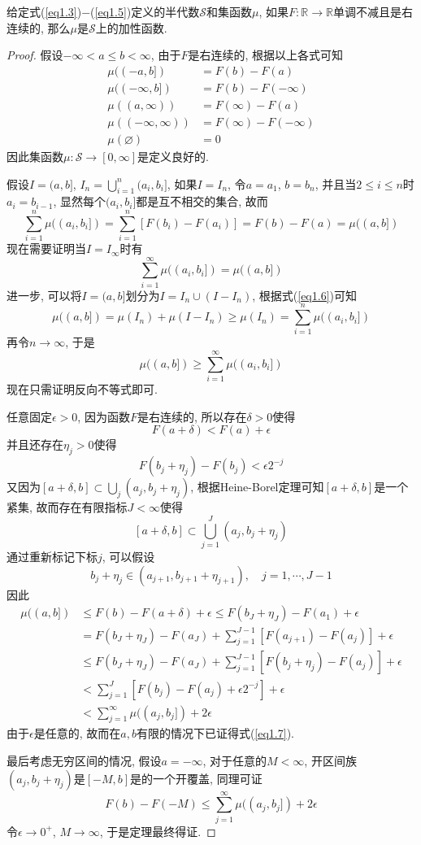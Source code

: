 \documentclass[cn, 12pt, math=mtpro2, bibstyle=apa, blue, twocol]{elegantbook}
\newcommand{\R}{\mathbb{R}}
\newcommand{\SE}{\mathcal{S}}
\let\emptyset\varnothing
\begin{document}
\begin{theorem}\label{thm:thm1.4}
  给定式(\ref{eq1.3})$-$(\ref{eq1.5})定义的半代数$\SE$和集函数$\mu$, 如果$F:\R\to\R$单调不减且是右连续的, 那么$\mu$是$\SE$上的加性函数.
\end{theorem}
\begin{proof}
  假设$-\infty<a\leq b<\infty$, 由于$F$是右连续的, 根据以上各式可知
  \begin{align*}
  \mu((-a,b])&=F(b)-F(a) \\
  \mu((-\infty,b])&=F(b)-F(-\infty) \\
  \mu((a,\infty))&=F(\infty)-F(a) \\
  \mu((-\infty,\infty))&=F(\infty)-F(-\infty) \\
  \mu(\emptyset)&=0
  \end{align*}
  因此集函数$\mu:\SE\to[0,\infty]$是定义良好的.

  假设$I=(a,b]$, $I_n=\bigcup_{i=1}^n(a_i,b_i]$, 如果$I=I_n$, 令$a=a_1$, $b=b_n$, 并且当$2\leq i\leq n$时$a_i=b_{i-1}$, 显然每个$(a_i,b_i]$都是互不相交的集合, 故而
  \begin{equation}\label{eq1.6}
    \sum_{i=1}^{n}\mu((a_i,b_i])=\sum_{i=1}^{n}[F(b_i)-F(a_i)]=F(b)-F(a)=\mu((a,b])
  \end{equation}
  现在需要证明当$I=I_\infty$时有
  \begin{equation}\label{eq1.7}
    \sum_{i=1}^{\infty}\mu((a_i,b_i])=\mu((a,b])
  \end{equation}
  进一步, 可以将$I=(a,b]$划分为$I=I_n\cup (I-I_n)$, 根据式(\ref{eq1.6})可知
  $$\mu((a,b])=\mu(I_n)+\mu(I-I_n)\geq \mu(I_n)=\sum_{i=1}^{n}\mu((a_i,b_i])$$
  再令$n\to\infty$, 于是
  $$\mu((a,b])\geq\sum_{i=1}^{\infty}\mu((a_i,b_i])$$
  现在只需证明反向不等式即可.

  任意固定$\epsilon>0$, 因为函数$F$是右连续的, 所以存在$\delta>0$使得
  $$F(a+\delta)<F(a)+\epsilon$$
  并且还存在$\eta_j>0$使得
  $$F(b_j+\eta_j)-F(b_j)<\epsilon2^{-j}$$
  又因为$[a+\delta,b]\subset\bigcup_j (a_j,b_j+\eta_j)$, 根据Heine-Borel定理可知$[a+\delta,b]$是一个紧集, 故而存在有限指标$J<\infty$使得
  $$[a+\delta,b]\subset\bigcup_{j=1}^J(a_j,b_j+\eta_j)$$
  通过重新标记下标$j$, 可以假设
  $$b_j+\eta_j\in (a_{j+1},b_{j+1}+\eta_{j+1}),\quad j=1,\cdots,J-1$$
  因此
  \begin{align*}
  \mu((a,b])&\leq F(b)-F(a+\delta)+\epsilon \leq F(b_J+\eta_J)-F(a_1)+\epsilon \\
  &=F(b_J+\eta_J)-F(a_J)+\sum_{j=1}^{J-1}[F(a_{j+1})-F(a_j)]+\epsilon \\
  &\leq F(b_J+\eta_J)-F(a_J)+\sum_{j=1}^{J-1}[F(b_j+\eta_j)-F(a_j)]+\epsilon \\
  &<\sum_{j=1}^{J}[F(b_j)-F(a_j)+\epsilon2^{-j}]+\epsilon \\
  &<\sum_{j=1}^{\infty} \mu((a_j,b_j])+2\epsilon
  \end{align*}
  由于$\epsilon$是任意的, 故而在$a, b$有限的情况下已证得式(\ref{eq1.7}).

  最后考虑无穷区间的情况, 假设$a=-\infty$, 对于任意的$M<\infty$, 开区间族$(a_j,b_j+\eta_j)$是$[-M,b]$是的一个开覆盖, 同理可证
  $$F(b)-F(-M)\leq\sum_{j=1}^{\infty}\mu((a_j,b_j])+2\epsilon$$
  令$\epsilon\to0^+$, $M\to\infty$, 于是定理最终得证.
\end{proof}
\end{document}
